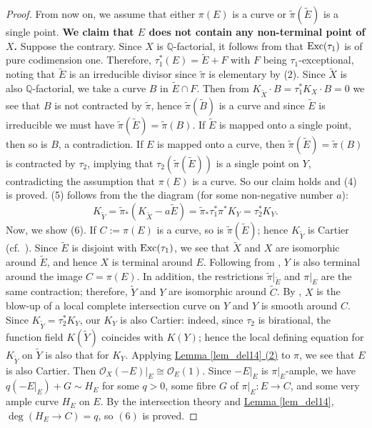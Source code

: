 \begin{proof}
From now on, we assume that either $\pi(E)$ is a curve or $\widetilde{\pi}(\widetilde{E})$ is a single point.
\textbf{We claim that $E$ does not contain any non-terminal point of $X$.}
Suppose the contrary.
Since $X$ is $\mathbb{Q}$-factorial, it follows from \cite[Corollary 2.63]{KM98} that $\textup{Exc}(\tau_1)$ is of pure codimension one.
Therefore, $\tau_1^*(E)=\widetilde{E}+F$ with $F$ being $\tau_1$-exceptional, noting that $\widetilde{E}$ is an irreducible divisor since $\widetilde\pi$ is elementary by (2).
Since $\widetilde{X}$ is also $\mathbb{Q}$-factorial, we take a curve $B$ in $\widetilde{E}\cap F$. Then from $K_{\widetilde{X}}\cdot B=\tau_1^*K_X\cdot B=0$ we see that $B$ is not contracted by $\widetilde\pi$, hence $\widetilde\pi(\widetilde B)$ is a curve and since $\widetilde E$ is irreducible we must have $\widetilde\pi(\widetilde E)=\widetilde\pi(B)$. 
If $\widetilde{E}$ is mapped onto a single point, then so is $B$, a contradiction.
If $E$ is mapped onto a curve, 
then $\widetilde{\pi}(\widetilde{E})=\widetilde{\pi}(B)$ is  contracted by $\tau_2$, implying that $\tau_2(\widetilde{\pi}(\widetilde{E}))$ is  a single point on $Y$, contradicting  the assumption that $\pi(E)$ is a curve.
So our claim holds and (4) is proved.
(5) follows from the the diagram (for some non-negative number $a$):
$$K_{\widetilde{Y}}=\widetilde{\pi}_*(K_{\widetilde{X}}-a\widetilde{E})=\widetilde{\pi}_*\tau_1^*\pi^*K_Y=\tau_2^*K_Y.$$
Now, we show (6). 
If $C:=\pi(E)$ is a curve, so is $\widetilde{\pi}(\widetilde{E})$; hence $K_{\widetilde{Y}}$ is Cartier
(cf.~\cite[Lemma 3]{Cut88}).
Since $\widetilde{E}$ is disjoint with $\textup{Exc}(\tau_1)$, we see that $\widetilde{X}$ and $X$ are isomorphic around $\widetilde{E}$, and hence $X$ is terminal around $E$.
Following from \cite[Corollary 3.43, pp.~104-105]{KM98}, $Y$ is also terminal around the image $C=\pi(E)$.
In addition, the restrictions $\widetilde{\pi}|_{\widetilde{E}}$ and $\pi|_E$ are the same contraction; therefore, $\widetilde{Y}$ and $Y$ are isomorphic around $\widetilde{C}$. 
By \cite[Theorem 4]{Cut88},  $X$ is the blow-up of a local complete intersection curve on $Y$ and $Y$ is smooth around $C$. 
Since $K_{\widetilde{Y}}=\tau_2^*K_Y$, our $K_Y$ is also Cartier: indeed, since $\tau_2$ is birational, the function field $K(\widetilde{Y})$  coincides with $K(Y)$; hence the local defining  equation for $K_{\widetilde{Y}}$ on $\widetilde{Y}$ is also that for $K_Y$. 
Applying {\hyperref[lem_del14]{Lemma  \ref*{lem_del14} (2)}} to $\pi$, we see that $E$ is also Cartier. 
Then  %
 $\mathcal{O}_X(-E)|_E\cong\mathcal{O}_E(1)$. 
Since $-E|_E$ is $\pi|_E$-ample, we have   $q(-E|_E)+G\sim H_E$ for some $q>0$, some fibre $G$ of $\pi|_E:E\to C$, and some very ample curve $H_E$ on $E$.
By the intersection theory and {\hyperref[lem_del14]{Lemma  \ref*{lem_del14}}}, $\deg (H_E\to C)=q$, so $(6)$ is proved.
\end{proof}



